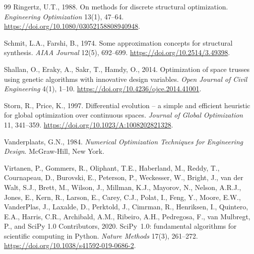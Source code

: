 \documentclass[lineno,pdflatex,sn-mathphys-num]{sn-jnl}
\begin{document}
\begin{thebibliography}{99}
Ringertz, U.T., 1988.
On methods for discrete structural optimization.
\textit{Engineering Optimization} 13(1), 47--64.
\url{https://doi.org/10.1080/03052158808940948}.

Schmit, L.A., Farshi, B., 1974.
Some approximation concepts for structural synthesis.
\textit{AIAA Journal} 12(5), 692--699.
\url{https://doi.org/10.2514/3.49398}.

Shallan, O., Eraky, A., Sakr, T., Hamdy, O., 2014.
Optimization of space trusses using genetic algorithms with innovative design variables.
\textit{Open Journal of Civil Engineering} 4(1), 1--10.
\url{https://doi.org/10.4236/ojce.2014.41001}.

Storn, R., Price, K., 1997.
Differential evolution -- a simple and efficient heuristic for global optimization over continuous spaces.
\textit{Journal of Global Optimization} 11, 341--359.
\url{https://doi.org/10.1023/A:1008202821328}.



Vanderplaats, G.N., 1984.
\textit{Numerical Optimization Techniques for Engineering Design}.
McGraw-Hill, New York.

Virtanen, P., Gommers, R., Oliphant, T.E., Haberland, M., Reddy, T.,
Cournapeau, D., Burovski, E., Peterson, P., Weckesser, W., Bright, J.,
van der Walt, S.J., Brett, M., Wilson, J., Millman, K.J., Mayorov, N.,
Nelson, A.R.J., Jones, E., Kern, R., Larson, E., Carey, C.J., Polat, I.,
Feng, Y., Moore, E.W., VanderPlas, J., Laxalde, D., Perktold, J., Cimrman, R.,
Henriksen, I., Quintero, E.A., Harris, C.R., Archibald, A.M., Ribeiro, A.H.,
Pedregosa, F., van Mulbregt, P., and SciPy 1.0 Contributors, 2020.
SciPy~1.0: fundamental algorithms for scientific computing in Python.
\textit{Nature Methods} 17(3), 261--272.
\url{https://doi.org/10.1038/s41592-019-0686-2}.


\end{thebibliography}
\end{document}
